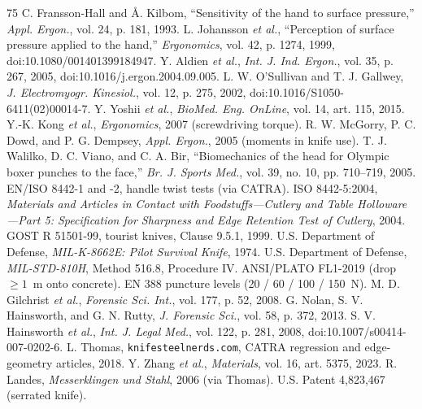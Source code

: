 \documentclass[10pt,journal,letterpaper]{IEEEtran}
\begin{document}
\begin{thebibliography}{75}
 C. Fransson-Hall and \AA. Kilbom, ``Sensitivity of the hand to surface pressure,'' \emph{Appl. Ergon.}, vol. 24, p. 181, 1993.
 L. Johansson \emph{et al.}, ``Perception of surface pressure applied to the hand,'' \emph{Ergonomics}, vol. 42, p. 1274, 1999, doi:10.1080/001401399184947.
 Y. Aldien \emph{et al.}, \emph{Int. J. Ind. Ergon.}, vol. 35, p. 267, 2005, doi:10.1016/j.ergon.2004.09.005.
 L. W. O'Sullivan and T. J. Gallwey, \emph{J. Electromyogr. Kinesiol.}, vol. 12, p. 275, 2002, doi:10.1016/S1050-6411(02)00014-7.
 Y. Yoshii \emph{et al.}, \emph{BioMed. Eng. OnLine}, vol. 14, art. 115, 2015.
 Y.-K. Kong \emph{et al.}, \emph{Ergonomics}, 2007 (screwdriving torque).
 R. W. McGorry, P. C. Dowd, and P. G. Dempsey, \emph{Appl. Ergon.}, 2005 (moments in knife use).
 T. J. Walilko, D. C. Viano, and C. A. Bir, ``Biomechanics of the head for Olympic boxer punches to the face,'' \emph{Br. J. Sports Med.}, vol. 39, no. 10, pp. 710--719, 2005.
 EN/ISO 8442-1 and -2, handle twist tests (via CATRA).
 ISO 8442-5:2004, \emph{Materials and Articles in Contact with Foodstuffs---Cutlery and Table Holloware---Part 5: Specification for Sharpness and Edge Retention Test of Cutlery}, 2004.
 GOST R 51501-99, tourist knives, Clause 9.5.1, 1999.
 U.S. Department of Defense, \emph{MIL-K-8662E: Pilot Survival Knife}, 1974.
 U.S. Department of Defense, \emph{MIL-STD-810H}, Method 516.8, Procedure IV.
 ANSI/PLATO FL1-2019 (drop $\ge 1$~m onto concrete).
 EN 388 puncture levels (20 / 60 / 100 / 150~N).
 M. D. Gilchrist \emph{et al.}, \emph{Forensic Sci. Int.}, vol. 177, p. 52, 2008.
 G. Nolan, S. V. Hainsworth, and G. N. Rutty, \emph{J. Forensic Sci.}, vol. 58, p. 372, 2013.
 S. V. Hainsworth \emph{et al.}, \emph{Int. J. Legal Med.}, vol. 122, p. 281, 2008, doi:10.1007/s00414-007-0202-6.
 L. Thomas, \texttt{knifesteelnerds.com}, CATRA regression and edge-geometry articles, 2018.
 Y. Zhang \emph{et al.}, \emph{Materials}, vol. 16, art. 5375, 2023.
 R. Landes, \emph{Messerklingen und Stahl}, 2006 (via Thomas).
 U.S. Patent 4,823,467 (serrated knife).
\end{thebibliography}
\end{document}
